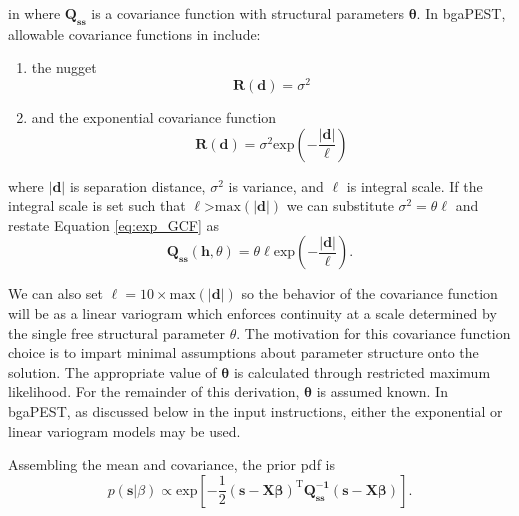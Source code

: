 \documentclass[11pt,oneside,onecolumn]{usgsreport}
\begin{document}
\begin{appendix}
 in
where $\mathbf{Q_{ss}}$ is a covariance function with structural
parameters $\mathbf{\theta}.$ In bgaPEST, allowable covariance functions
 in
include:
\begin{enumerate}
\item the nugget
\[
\mathbf{R}\left(\mathbf{d}\right)=\sigma^{2}
\]

\item and the exponential covariance function 
\begin{equation}
\mathbf{R}(\mathbf{d})=\sigma^{2}\mathrm{exp}(\mathbf{-}\frac{\left|\mathbf{d}\right|}{\ell})\label{eq:exp_GCF}
\end{equation}

\end{enumerate}
where $\left|\mathbf{d}\right|$ is separation distance, $\sigma^{2}$
is variance, and $\ell$ is integral scale. If the integral scale
is set such that $\ell$>$\mathrm{max}(\left|\mathbf{d}\right|)$ we
can substitute $\sigma^{2}=\theta\ell$ and restate Equation \ref{eq:exp_GCF}
as
\begin{equation}
\mathbf{Q_{ss}}(\mathbf{h},\theta)=\theta\ell\mathrm{exp}(-\frac{\mathbf{\left|\mathbf{d}\right|}}{\ell})\label{eq:Qss}.
\end{equation}


We can also set $\ell=10\times\mathrm{max(\mathbf{\left|d\right|})}$
so the behavior of the covariance function will be as a linear variogram
\citep{FienenWRR2008} which enforces continuity at a scale determined
by the single free structural parameter $\theta.$ The motivation
for this covariance function choice is to impart minimal assumptions
about parameter structure onto the solution. The appropriate value
of $\mathbf{\theta}$ is calculated through restricted maximum likelihood.
For the remainder of this derivation, $\mathbf{\theta}$ is assumed
known. In bgaPEST, as discussed below in the input instructions, either
the exponential or linear variogram models may be used.

Assembling the mean and covariance, the prior pdf is
\begin{equation}
p(\mathbf{s}|\beta)\propto\mathrm{exp\left[\mathbf{-}\frac{1}{2}(\mathbf{s-X\beta})^{T}\mathbf{Q_{ss}^{-1}}(\mathbf{s-X\beta})\right]}\label{eq:prior}.
\end{equation}



\end{appendix}
\end{document}
